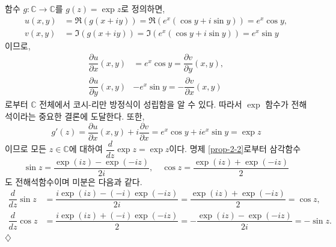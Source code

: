 \begin{salt_example} \label{example-2-8}
함수 $g:\mathbb C \to \mathbb C$를 $g(z) = \exp z$로 정의하면,
\begin{align*}
u(x,y) &= \Re(g(x+iy)) = \Re(e^x(\cos y + i\sin y)) = e^x \cos y,\\
v(x,y) &= \Im(g(x+iy)) = \Im(e^x(\cos y + i\sin y)) = e^x \sin y
\end{align*}
이므로, 
\begin{align*}
\dfrac{\partial u}{\partial x}(x,y) &= e^x\cos y 
= \dfrac{\partial v}{\partial y}(x,y), \\
\dfrac{\partial u}{\partial y}(x,y) & -e^x\sin y 
= - \dfrac{\partial v}{\partial x}(x,y)
\end{align*}
로부터 $\mathbb C$ 전체에서 코시-리만 방정식이 성립함을 알 수 있다.
따라서 $\exp$ 함수가 전해석이라는 중요한 결론에 도달한다.
또한, 
\[
g'(z) = \dfrac{\partial u}{\partial x}(x,y) + i\dfrac{\partial v}{\partial x}
= e^x\cos y + i e^x\sin y = \exp z
\]
이므로 모든 $z\in\mathbb C$에 대하여 $\dfrac{d}{dz}\exp z = \exp z$이다.
명제 \ref{prop-2-2}로부터 삼각함수
\[
\sin z  = \dfrac{\exp(iz) - \exp(-iz)}{2i}, \quad
\cos z = \dfrac{\exp(iz) + \exp(-iz)}2
\]
도 전해석함수이며 미분은 다음과 같다.
\begin{align*}
\dfrac{d}{dz} \sin z &= \dfrac{i\exp(iz) - (-i)\exp(-iz)}{2i}
= \dfrac{\exp(iz) + \exp(-iz)}2 = \cos z, \\
\dfrac{d}{dz} \cos z &= \dfrac{i\exp(iz)+(-i)\exp(-iz)}2
= - \dfrac{\exp(iz) - \exp(-iz)}{2i} = - \sin z.
\end{align*}
\hfill $\diamondsuit$
\end{salt_example}

